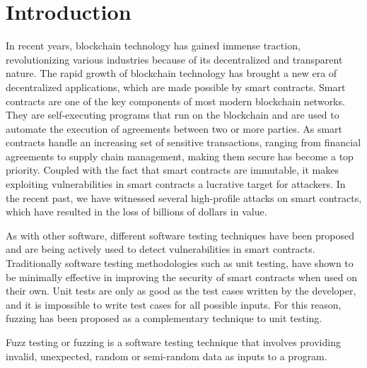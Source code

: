 
\chapter{Introduction}\label{chapter:introduction}
In recent years, blockchain technology has gained immense traction, revolutionizing various industries because of its decentralized and transparent nature.
The rapid growth of blockchain technology has brought a new era of decentralized applications, which are made possible by smart contracts.
Smart contracts are one of the key components of most modern blockchain networks.
They are self-executing programs that run on the blockchain and are used to automate the execution of agreements between two or more parties.
As smart contracts handle an increasing set of sensitive transactions, ranging from financial agreements to supply chain management, making them secure has become a top priority.
Coupled with the fact that smart contracts are immutable, it makes exploiting vulnerabilities in smart contracts a lucrative target for attackers.
In the recent past, we have witnessed several high-profile attacks on smart contracts, which have resulted in the loss of billions of dollars in value.

As with other software, different software testing techniques have been proposed and are being actively used to detect vulnerabilities in smart contracts.
Traditionally software testing methodologies such as unit testing, have shown to be minimally effective in improving the security of smart contracts when used on their own.
Unit tests are only as good as the test cases written by the developer, and it is impossible to write test cases for all possible inputs.
For this reason, fuzzing has been proposed as a complementary technique to unit testing.

Fuzz testing or fuzzing is a software testing technique that involves providing invalid, unexpected, random or semi-random data as inputs to a program.




